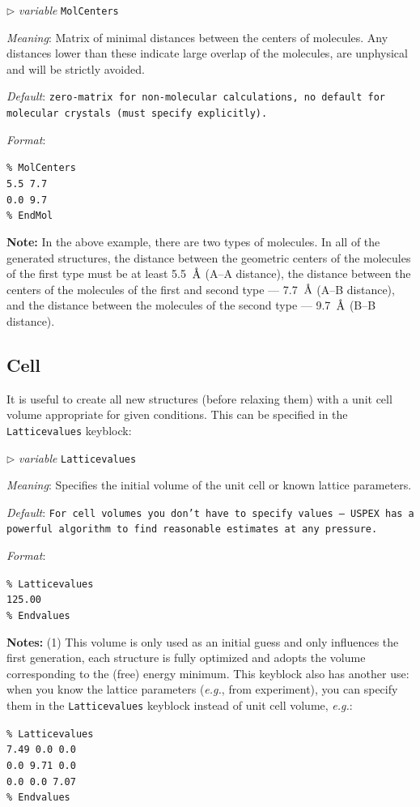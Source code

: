 \documentclass[12pt]{article}
\newcommand{\keyword}[1]{\texttt{#1}}
\newcommand{\textshift}[1]{{\addtolength{\leftskip}{10mm}\texttt{{#1}}\par}}
\newcommand{\paramacro}[6]{
\vspace{0.5cm}
$\triangleright$ \emph{variable} {\color{blue} \texttt{#1}}

\emph{Meaning}: {#2}

{#3}

\emph{Default}: \texttt{#4}

\emph{Format}:

{\addtolength{\leftskip}{10mm} 
\texttt{#5}
\par}


{\small #6}

}
\begin{document}
\paramacro{MolCenters}{Matrix of minimal distances between the centers of
molecules. Any distances lower than these indicate large overlap of the
molecules, are unphysical and will be strictly avoided.}{}{\rm zero-matrix for
non-molecular calculations, no default for molecular crystals (must specify
explicitly).}{\% MolCenters \\
5.5 7.7 \\
0.0 9.7 \\
\% EndMol}{
\textbf{Note:} In the above example, there are two types of molecules. In all of
the generated structures, the distance between the geometric centers of the
molecules of the first type must be at least 5.5~$\text{\r{A}}$ (A--A distance),
the distance between the centers of the molecules of the first and second type
--- 7.7~$\text{\r{A}}$ (A--B distance), and the distance between the molecules
of the second type --- 9.7~$\text{\r{A}}$ (B--B distance).}


\subsection{Cell} \label{input_cell}

It is useful to create all new structures (before relaxing them) with a unit
cell volume appropriate for given conditions. This can be specified in the
\keyword{Latticevalues} keyblock:

\paramacro{Latticevalues}{Specifies the initial volume of the unit cell or known
lattice parameters.}{}{\rm For cell volumes you don't have to specify values ---
USPEX has a powerful algorithm to find reasonable estimates at any pressure.}
{\% Latticevalues \\
125.00 \\
\% Endvalues}{}


\textbf{Notes:} (1) This volume is only used as an initial guess and only
influences the first generation, each structure is fully optimized and adopts
the volume corresponding to the (free) energy minimum. This keyblock also has
another use: when you know the lattice parameters (\emph{e.g.}, from
experiment), you can specify them in the \keyword{Latticevalues} keyblock
instead of unit cell volume, \emph{e.g.}:

\textshift{\% Latticevalues \\ 
7.49 0.0 0.0 \\
0.0 9.71 0.0 \\
0.0 0.0 7.07 \\
\% Endvalues
}
\end{document}
